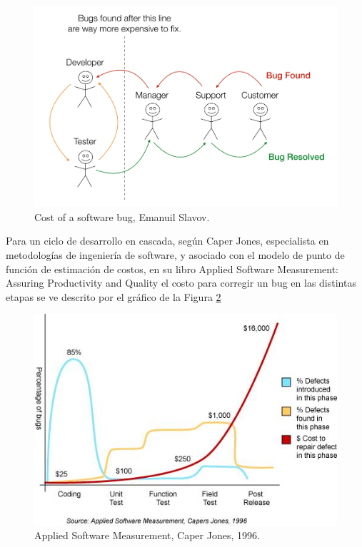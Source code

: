 \begin{figure}[h]
    \centering
    \includegraphics[scale=0.5]{images/the_cost_of_a_defect.png}
    \caption{Cost of a software bug, Emanuil Slavov.}
    \label{fig:cost of a defect}
\end{figure}

Para un ciclo de desarrollo en cascada, según Caper Jones, especialista en metodologías de ingeniería de software, y asociado con el modelo de punto de función de estimación de costos, en su libro Applied Software Measurement: Assuring Productivity and Quality\cite{jones2008applied} el costo para corregir un bug en las distintas etapas se ve descrito por el gráfico de la Figura \ref{fig:applied cost measurement}

\begin{figure}[h]
    \centering
    \includegraphics[scale=0.5]{images/AppliedSoftwareMeasurement.png}
    \caption{Applied Software Measurement, Caper Jones, 1996.}
    \label{fig:applied cost measurement}
\end{figure}

